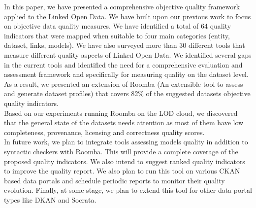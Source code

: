 \documentclass[onecolumn, crcready]{iosart2c}
\begin{document}
In this paper, we have presented a comprehensive objective quality framework applied to the Linked Open Data. We have built upon our previous work to focus on objective data quality measures. We have identified a total of 64 quality indicators that were mapped when suitable to four main categories (entity, dataset, links, models). We have also surveyed more than 30 different tools that measure different quality aspects of Linked Open Data. We identified several gaps in the current tools and identified the need for a comprehensive evaluation and assessment framework and specifically for measuring quality on the dataset level. As a result, we presented an extension of Roomba (An extensible tool to assess and generate dataset profiles) that covers 82\% of the suggested datasets objective quality indicators.\\
Based on our experiments running Roomba on the LOD cloud, we discovered that the general state of the datasets needs attention as most of them have low completeness, provenance, licensing and correctness quality scores.\\
In future work, we plan to integrate tools assessing models quality in addition to syntactic checkers with Roomba. This will provide a complete coverage of the proposed quality indicators. We also intend to suggest ranked quality indicators to improve the quality report. We also plan to run this tool on various CKAN based data portals and schedule periodic reports to monitor their quality evolution. Finally, at some stage, we plan to extend this tool for other data portal types like DKAN and Socrata.



\end{document}
